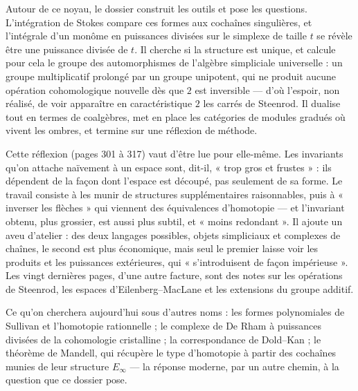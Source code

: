 \documentclass[11pt,a4paper]{article}
\begin{document}
\begin{resume}
Autour de ce noyau, le dossier construit les outils et pose les questions.
L'intégration de Stokes compare ces formes aux cochaînes singulières, et
l'intégrale d'un monôme en puissances divisées sur le simplexe de taille $t$
se révèle être une puissance divisée de $t$. Il cherche si la structure est
unique, et calcule pour cela le groupe des automorphismes de l'algèbre
simpliciale universelle : un groupe multiplicatif prolongé par un groupe
unipotent, qui ne produit aucune opération cohomologique nouvelle dès que $2$
est inversible — d'où l'espoir, non réalisé, de voir apparaître en
caractéristique $2$ les carrés de Steenrod. Il dualise tout en termes de
coalgèbres, met en place les catégories de modules gradués où vivent les
ombres, et termine sur une réflexion de méthode.

Cette réflexion (pages 301 à 317) vaut d'être lue pour elle-même. Les invariants
qu'on attache naïvement à un espace sont, dit-il, « trop gros et frustes » : ils
dépendent de la façon dont l'espace est découpé, pas seulement de sa forme. Le
travail consiste à les munir de structures supplémentaires raisonnables, puis à
« inverser les flèches » qui viennent des équivalences d'homotopie — et
l'invariant obtenu, plus grossier, est aussi plus subtil, et « moins
redondant ». Il ajoute un aveu d'atelier : des deux langages possibles, objets
simpliciaux et complexes de chaînes, le second est plus économique, mais seul le
premier laisse voir les produits et les puissances extérieures, qui
« s'introduisent de façon impérieuse ». Les vingt dernières pages, d'une autre
facture, sont des notes sur les opérations de Steenrod, les espaces
d'Eilenberg–MacLane et les extensions du groupe additif.

Ce qu'on cherchera aujourd'hui sous d'autres noms : les formes polynomiales de
Sullivan et l'homotopie rationnelle ; le complexe de De Rham à puissances
divisées de la cohomologie cristalline ; la correspondance de Dold–Kan ; le
théorème de Mandell, qui récupère le type d'homotopie à partir des cochaînes
munies de leur structure $E_\infty$ — la réponse moderne, par un autre chemin,
à la question que ce dossier pose.


\end{resume}
\end{document}
